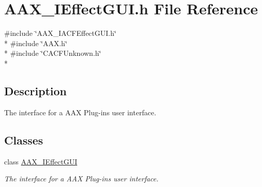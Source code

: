 \hypertarget{a00246}{}\section{A\+A\+X\+\_\+\+I\+Effect\+G\+U\+I.\+h File Reference}
\label{a00246}
{\ttfamily \#include \char`\"{}A\+A\+X\+\_\+\+I\+A\+C\+F\+Effect\+G\+U\+I.\+h\char`\"{}}\\*
{\ttfamily \#include \char`\"{}A\+A\+X.\+h\char`\"{}}\\*
{\ttfamily \#include \char`\"{}C\+A\+C\+F\+Unknown.\+h\char`\"{}}\\*


\subsection{Description}
The interface for a A\+A\+X Plug-\/in\textquotesingle{}s user interface. 

\subsection*{Classes}
\begin{DoxyCompactItemize}
\item 
class \hyperlink{a00098}{A\+A\+X\+\_\+\+I\+Effect\+G\+U\+I}
\begin{DoxyCompactList}\small\item\em The interface for a A\+A\+X Plug-\/in\textquotesingle{}s user interface. \end{DoxyCompactList}\end{DoxyCompactItemize}
